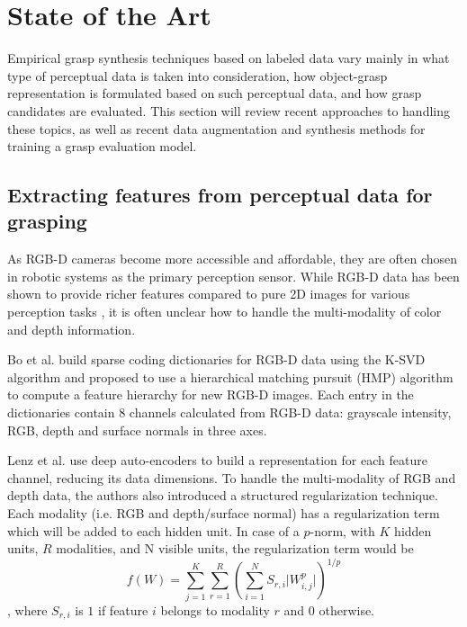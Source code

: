 
\chapter{State of the Art}

Empirical grasp synthesis techniques based on labeled data vary mainly in what type of perceptual data is taken into
consideration, how object-grasp representation is formulated based on such perceptual data, and how grasp candidates are
evaluated. This section will review recent approaches to handling these topics, as well as recent data augmentation and
synthesis methods for training a grasp evaluation model.


\section{Extracting features from perceptual data for grasping}
As RGB-D cameras become more accessible and affordable, they are often chosen in robotic systems as the primary
perception sensor. While RGB-D data has been shown to provide richer features compared to pure 2D images for various
perception tasks \cite{lenz2015,Eitel2015,Gupta2014RGBDFeatures,jiang2011}, it is often unclear how to handle the
multi-modality of color and depth information.

Bo et al. \cite{Bo2013} build sparse coding dictionaries for RGB-D data using the K-SVD algorithm and proposed to use
a hierarchical matching pursuit (HMP)  algorithm to compute a feature hierarchy for new RGB-D images. Each entry in the
dictionaries contain 8 channels calculated from RGB-D data: grayscale intensity, RGB, depth and surface normals in three
axes.

Lenz et al. \cite{lenz2015} use deep auto-encoders to build a representation for each feature channel, reducing its data
dimensions. To handle the multi-modality of RGB and depth data, the authors also introduced a structured regularization
technique. Each modality (i.e. RGB and depth/surface normal) has a regularization term which will be added to each
hidden unit. In case of a $ p $-norm, with $K$ hidden units, $R$ modalities, and N visible units, the regularization
term would be
\begin{equation} \label{eq:structured_regularization}
    f(W) = \sum\limits^K_{j=1} \sum\limits^R_{r=1} \left( \sum\limits^N_{i=1} S_{r,i} \lvert W^p_{i,j} \rvert \right)
    ^{1/p}
\end{equation}
, where $S_{r,i}$ is $1$ if feature $i$ belongs to modality $r$ and $0$ otherwise.

